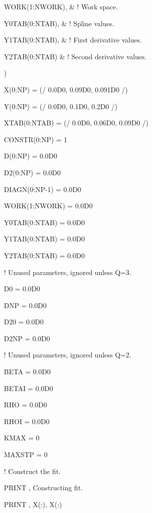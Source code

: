 {\item{}   \hskip 10mm WORK(1:NWORK), \textCyan\& \textBlack \textMaroon ! Work space. \textBlack $ $
\item{}   \hskip 10mm Y0TAB(0:NTAB), \textCyan\& \textBlack \textMaroon ! Spline values. \textBlack $ $
\item{}   \hskip 10mm Y1TAB(0:NTAB), \textCyan\& \textBlack \textMaroon ! First derivative values. \textBlack $ $
\item{}   \hskip 10mm Y2TAB(0:NTAB) \textCyan\& \textBlack \textMaroon ! Second derivative values. \textBlack $ $
\item{}   )
\item{}   X(0:NP) = (/ 0.0D0, 0.09D0, 0.091D0 /)
\item{}   Y(0:NP) = (/ 0.0D0, 0.1D0, 0.2D0 /)
\item{}   XTAB(0:NTAB) = (/ 0.0D0, 0.06D0, 0.09D0 /)
\item{}   CONSTR(0:NP) = 1
\item{}   D(0:NP) = 0.0D0
\item{}   D2(0:NP) = 0.0D0
\item{}   DIAGN(0:NP-1) = 0.0D0
\item{}   WORK(1:NWORK) = 0.0D0
\item{}   Y0TAB(0:NTAB) = 0.0D0
\item{}   Y1TAB(0:NTAB) = 0.0D0
\item{}   Y2TAB(0:NTAB) = 0.0D0
\item{}   \textMaroon ! Unused parameters, ignored unless Q=3. \textBlack
\item{}   D0 = 0.0D0
\item{}   DNP = 0.0D0
\item{}   D20 = 0.0D0
\item{}   D2NP = 0.0D0
\item{}   \textMaroon ! Unused parameters, ignored unless Q=2. \textBlack
\item{}   BETA = 0.0D0
\item{}   BETAI = 0.0D0
\item{}   RHO = 0.0D0
\item{}   RHOI = 0.0D0
\item{}   KMAX = 0
\item{}   MAXSTP = 0
\item{}   \textMaroon ! Construct the fit. \textBlack
\item{}   \textCyan PRINT \textBlack *, Constructing fit.{}\textBlack
\item{}   \textCyan PRINT \textBlack *, X(:){}\textBlack, X(:)
}
